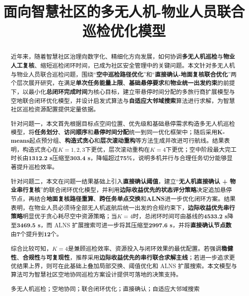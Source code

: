 \documentclass[12pt]{article}
\title{面向智慧社区的多无人机-物业人员联合巡检优化模型}
\makeatletter
\renewcommand{\maketitle}{
\begin{center}
{\heiti\zihao{-3}\@title\par}
\end{center}
\vspace{1em}
}
\makeatother
\begin{document}
\pagestyle{plain}
\setcounter{page}{1}
\singlespacing
\songti{}

\maketitle

\begin{abstract}
近年来，随着智慧社区治理向数字化、精细化方向发展，如何协调\textbf{多无人机巡检}与\textbf{物业人工复核}、缩短巡检闭环时间，已成为社区安全管理中的关键问题。本文针对多无人机与物业人员联合巡检问题，围绕“\textbf{空中巡检路径优化}”和“\textbf{直接确认-地面复核联合优化}”两个层次展开研究，在满足\textbf{单次任务能量上限}、\textbf{基础悬停要求}和\textbf{物业统一出发约束}的前提下，以最小化\textbf{总闭环完成时间}为核心目标，建立带悬停时间分配的多旅行商扩展模型与空地联合闭环优化模型，并设计启发式算法与\textbf{自适应大邻域搜索}算法进行求解，为智慧社区巡检资源配置提供定量依据。

针对问题一，本文首先根据目标点空间位置、优先级和基础悬停需求构造多无人机巡检模型，将\textbf{任务划分}、\textbf{访问顺序}和\textbf{悬停时间分配}统一到同一优化框架中；随后采用\textbf{K-means}起点预分组、\textbf{构造式贪心}和\textbf{层次滚动重构}等方法生成并改进可行航线。结果表明，构造式贪心在\textbf{$K=1,2,3$}下更优，层次滚动重构在\textbf{$K=4$}下更优；空中阶段最大完工时长由\textbf{1312.2 s}压缩至\textbf{303.4 s}，降幅超过\textbf{75\%}，说明多机并行与合理任务切分能够显著提升巡检效率。

针对问题二，本文在问题一结果基础上引入\textbf{直接确认阈值}，建立“\textbf{无人机直接确认 + 物业串行复核}”的联合闭环优化模型，并利用\textbf{边际收益优先的状态评分策略}决定追加悬停节点，再结合\textbf{地面复核路径重算}、\textbf{跨任务单点交换}和\textbf{ALNS}进一步优化闭环方案。结果表明，在物业人员必须待全部无人机返航后统一出发的合规约束下，\textbf{边际收益优先串行策略}明显优于贪心耗尽空中资源策略；当\textbf{$K=4$}时，总闭环时间可由基线的\textbf{4533.2 s}降至\textbf{3469.5 s}，而 ALNS 扩展搜索可进一步将其压缩至\textbf{2997.6 s}，并将\textbf{直接确认节点数}由\textbf{7}个提升到\textbf{12}个。

综合比较可知，\textbf{$K=4$}是兼顾巡检效率、资源投入与闭环效果的最优配置。若强调\textbf{稳健性}、\textbf{合规性}与\textbf{可复现性}，推荐采用\textbf{边际收益优先的串行联合求解主线}；若进一步追求更优结果上界，则可在此基础上叠加局部交换、阈值优化和 ALNS 扩展搜索。本文模型与算法可为智慧社区空地协同巡检方案设计提供可落地的决策支持。

\par{} 多无人机巡检；空地协同；联合闭环优化；直接确认；自适应大邻域搜索
\end{abstract}
\end{document}
